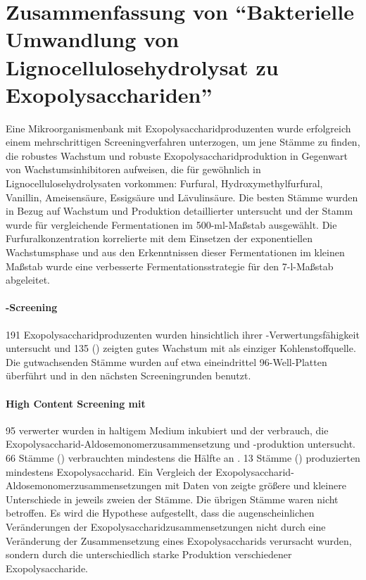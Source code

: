 {}
\section*{Zusammenfassung von \enquote{Bakterielle Umwandlung von Lignocellulosehydrolysat zu Exopolysacchariden}}
Eine Mikroorganismenbank mit Exopolysaccharidproduzenten wurde erfolgreich einem mehr\-schrit\-tigen Screeningverfahren unterzogen, um jene Stämme zu finden, die robustes Wachstum und robuste Exopolysaccharidproduktion in Gegenwart von Wachstumsinhibitoren aufweisen, die für gewöhnlich in Lignocellulosehydrolysaten vorkommen: Furfural, Hydroxymethylfurfural, Vanillin, Ameisensäure, Essigsäure und Lävulinsäure. Die besten Stämme wurden in Bezug auf Wachstum und Produktion detaillierter untersucht und der Stamm \strain{} wurde für vergleichende Fermentationen im 500-ml-Maßstab ausgewählt. Die Furfuralkonzentration korrelierte mit dem Einsetzen der exponentiellen Wachstumsphase und aus den Erkenntnissen dieser Fermentationen im kleinen Maßstab wurde eine verbesserte Fermentationsstrategie für den 7-l-Maßstab abgeleitet.

\paragraph{\XYL{}-Screening}
191 Exopolysaccharidproduzenten wurden hinsichtlich ihrer \XYL{}-Verwertungsfähigkeit untersucht und 135 () zeigten gutes Wachstum mit \XYL{} als einziger Kohlenstoffquelle. Die gutwachsenden Stämme wurden auf etwa eineindrittel 96-Well-Platten überführt und in den nächsten Screeningrunden benutzt.

\paragraph{High Content Screening mit \XYL{}}
95 \XYL{}verwerter wurden  in \xyl{}haltigem Medium inkubiert und der \XYL{}verbrauch, die Exopoly\-saccharid-Aldose\-monomer\-zusammen\-setzung und -produktion untersucht. 66 Stämme () verbrauchten mindestens die Hälfte an \XYL{}. 13 Stämme () produzierten mindestens  Exopolysaccharid. Ein Vergleich der Exopoly\-saccharid-Aldose\-monomer\-zusammen\-setzungen mit Daten von \textcite{Ruehmann2015a} zeigte größere und kleinere Unterschiede in jeweils zweien der Stämme. Die übrigen Stämme waren nicht betroffen. Es wird die Hypothese aufgestellt, dass die augenscheinlichen Veränderungen der Exopolysaccharidzusammensetzungen nicht durch eine Veränderung der Zusammensetzung eines Exopolysaccharids verursacht wurden, sondern durch die unterschiedlich starke Produktion verschiedener Exopolysaccharide.

